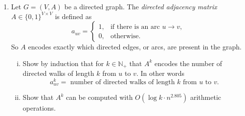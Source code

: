 \documentclass[11pt]{article}
\renewcommand{\leq}{\leqslant}
\renewcommand{\geq}{\geqslant}
\begin{document}
\begin{enumerate}[1)]
\begin{solution}
\begin{enumerate}[i)]
\item Let $C$ be a cycle of negative weight. 
Define $\lambda\in \mathbb{R}^{A}_{\geq 0}$ such that $\lambda_{uv}=1$ if $(u,v)\in C$ and $\lambda_{uv}=0$ otherwise. Then
$$\sum_{(u,v)\in A} \lambda_{uv} (\pi(v)-\pi(u)) = \sum_{(u,v)\in C} (\pi(v)-\pi(u)) = 0,$$ 
and 
$$\sum_{(u,v)\in A} \lambda_{uv} c_{uv} = \sum_{(u,v)\in C} c_{uv} < 0.$$
Thus $\lambda$ is a Farkas certificate of infeasibility.

\item For each vertex $v \in V$, let $\pi^*(v)$ be the distance of the shortest path from $s$ to $v$, which is finite since every vertex $v$ is reachable from $s$. Since there are no negative cycles, the distances are well-defined; also they satisfy
\[
\pi^*(v) \leq \pi^*(u)+c_{uv} \qquad \forall \;(u,v)\in A,
\]
and $\pi^*(s)=0$. Hence $\pi^*(v)$ is feasible for the linear program.

Now let $\pi: V \to \mathbb{R}$ be any feasible solution which satisfies \ref{eq:pot5} with $\pi(s)=0$. For any vertex $v \in V$, consider a directed $s$--$v$ path
$s=v_0 \to v_1 \to \cdots \to v_k=v$, one has
\[
\pi(v) \leq \pi(s)+\sum_{i=0}^{k-1} c_{v_i v_{i+1}}
= \sum_{i=0}^{k-1} c_{v_i v_{i+1}},
\]
which implies that $\pi(v) \leq \pi^*(v)$. Thus $\pi^*$ maximizes $\sum_{v \in V} \pi(v)$. 
Eventually we prove the uniqueness. Suppose that there exists another optimal solution $\pi'\neq \pi^*$. Then for some $v \in V$, we have $\pi'(v) < \pi^*(v)$. However, this implies that $\sum_{v \in V} \pi'(v) < \sum_{v \in V} \pi^*(v)$, contradicting the optimality of $\pi'$. 
\end{enumerate}
\end{solution}

\item \label{ex:count:paths} Let $G = (V,A)$ be a directed graph. The \emph{directed adjacency matrix} $A \in \{0,1\}^{V \times V}$ is  defined as 
\[
a_{uv} =
\begin{cases}
1, & \text{if there is an arc } u\to v,\\
0, & \text{otherwise.}
\end{cases}
\]
So \(A\) encodes exactly which directed edges, or arcs, are present in the graph.
\begin{enumerate}[i)] 
\item Show by induction that for  $k \in \mathbb{N}_+$ that  $A^k$ encodes the number of directed walks of length $k$ from $u$ to $v$. In other words
  \[
a^k_{uv} =  \text{ number of directed walks of length $k$ from $u$ to $v$.} 
\]
\item Show that $A^k$ can be computed with $O(\log k \cdot n^{2.805})$ arithmetic operations.
\end{enumerate}


\end{enumerate}
\end{document}
